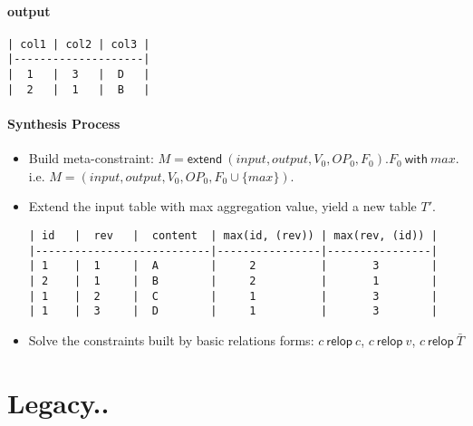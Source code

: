 \documentclass[letter, notitlepage]{article}
\begin{document}
\paragraph{output}
\begin{verbatim}
| col1 | col2 | col3 |
|--------------------|
|  1   |  3   |  D   |
|  2   |  1   |  B   |
\end{verbatim}

\paragraph{Synthesis Process} 

\begin{itemize}
\item Build meta-constraint: $M=\mathsf{extend}~(input, output, V_0, \mathit{OP}_0, F_0).F_0~\mathsf{with}~\mathit{max}$. \\
i.e. $M=(input, output, V_0, \mathit{OP}_0, F_0\cup\{\mathit{max}\})$.
\item Extend the input table with max aggregation value, yield a new table $T'$.
\begin{verbatim}
| id   |  rev   |  content  | max(id, (rev)) | max(rev, (id)) |
|---------------------------|----------------|----------------|
| 1    |  1     |  A        |     2          |       3        |
| 2    |  1     |  B        |     2          |       1        |
| 1    |  2     |  C        |     1          |       3        |
| 1    |  3     |  D        |     1          |       3        |
\end{verbatim}
\item Solve the constraints built by basic relations forms: $c~\mathsf{relop}~c$, $c~\mathsf{relop}~v$, $c~\mathsf{relop}~\bar{T}$ 
\end{itemize}




\newpage
\section{Legacy..}
\end{document}
